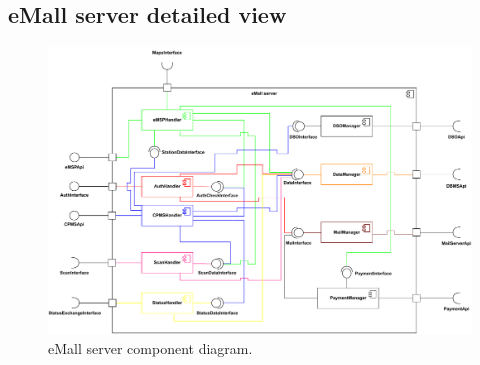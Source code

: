 \subsection{eMall server detailed view}
\begin{figure}[H]
    \centering
    \includegraphics[width=\textwidth]{images/ComponentSpecifico.pdf}
    \caption{eMall server component diagram.}
    \label{fig:ComponentSpec}
\end{figure}
